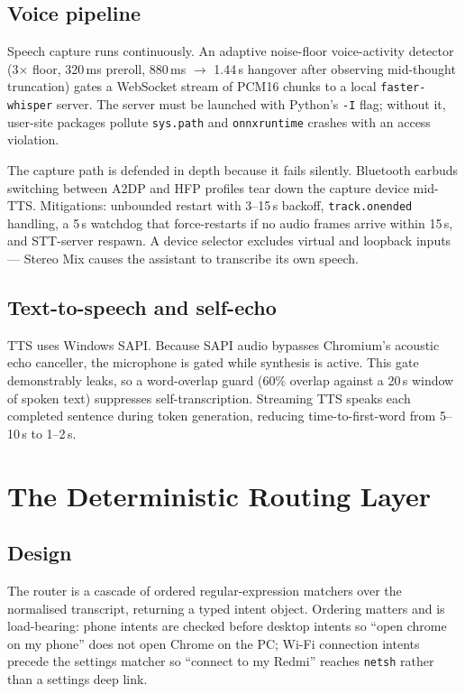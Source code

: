 \documentclass[10pt,twocolumn]{article}
\newcommand{\code}[1]{\texttt{\small #1}}
\begin{document}
\subsection{Voice pipeline}

Speech capture runs continuously. An adaptive noise-floor voice-activity detector
(3$\times$ floor, 320\,ms preroll, 880\,ms $\to$ 1.44\,s hangover after observing
mid-thought truncation) gates a WebSocket stream of PCM16 chunks to a local
\code{faster-whisper} server. The server must be launched with Python's \code{-I} flag;
without it, user-site packages pollute \code{sys.path} and \code{onnxruntime} crashes
with an access violation.

The capture path is defended in depth because it fails silently. Bluetooth earbuds
switching between A2DP and HFP profiles tear down the capture device mid-TTS. Mitigations:
unbounded restart with 3--15\,s backoff, \code{track.onended} handling, a 5\,s watchdog
that force-restarts if no audio frames arrive within 15\,s, and STT-server respawn. A
device selector excludes virtual and loopback inputs --- Stereo Mix causes the assistant
to transcribe its own speech.

\subsection{Text-to-speech and self-echo}

TTS uses Windows SAPI. Because SAPI audio bypasses Chromium's acoustic echo canceller,
the microphone is gated while synthesis is active. This gate demonstrably leaks, so a
word-overlap guard (60\% overlap against a 20\,s window of spoken text) suppresses
self-transcription. Streaming TTS speaks each completed sentence during token
generation, reducing time-to-first-word from 5--10\,s to 1--2\,s.

\section{The Deterministic Routing Layer}
\label{sec:routing}

\subsection{Design}

The router is a cascade of ordered regular-expression matchers over the normalised
transcript, returning a typed intent object. Ordering matters and is load-bearing: phone
intents are checked before desktop intents so ``open chrome on my phone'' does not open
Chrome on the PC; Wi-Fi connection intents precede the settings matcher so ``connect to
my Redmi'' reaches \code{netsh} rather than a settings deep link.
\end{document}
